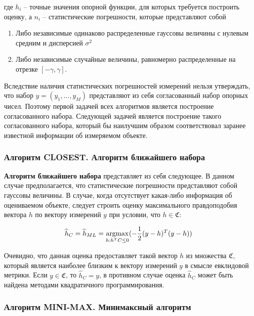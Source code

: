 \documentclass[a4paper, 12pt, titlepage]{article}
\theoremstyle{definition}
\theoremstyle{plain}
\theoremstyle{plain}
\begin{document}
где $h_{i}$ -- точные значения опорной функции, для которых требуется построить
оценку, а $n_{i}$ -- статистические погрешности, которые представляют собой

\begin{enumerate}
 \item Либо независимые одинаково распределенные гауссовы величины с нулевым
 средним и дисперсией $\sigma^{2}$
 \item Либо независимые случайные величины, равномерно распределенные на отрезке
 $[ - \gamma, \gamma]$.
\end{enumerate}

Вследствие наличия статистических погрешностей измерений нельзя утверждать, что
набор $y = (y_{1}, \ldots, y_{M})$ представляют из себя согласованный набор
опорных чисел. Поэтому первой задачей всех алгоритмов является построение
согласованного набора. Следующей задачей является построение такого
согласованного набора, который бы наилучшим образом соответствовал заранее
известной информации об измеряемом объекте.

\subsubsection{Алгоритм CLOSEST. Алгоритм ближайшего набора}
\label{sec:history/PrinceW90/algo-CLOSEST}

\textbf{Алгоритм ближайшего набора} представляет из себя следующее. В данном
случае предполагается, что статистические погрешности представляют собой
гауссовы величины. В случае, когда отсутствует какая-либо информация об
оцениваемом объекте, следует строить оценку максимального правдоподобия вектора
$h$ по вектору измерений $y$ при условии, что $h \in \mathfrak{C}$:

\begin{equation}
\widehat{h}_{C} = \widehat{h}_{ML} =
\operatornamewithlimits{argmax}_{h: h^{T} C \leq 0}
( - \frac{1}{2} (y - h)^{T} (y - h))
\end{equation}

Очевидно, что данная оценка предоставляет такой вектор $h$ из множества
$\mathfrak{C}$, который является наиболее близким к вектору измерений $y$ в
смысле евклидовой метрики. Если $y \in \mathfrak{C}$, то $\widehat{h}_{C} = y$,
в противном случае оценка $\widehat{h}_{C}$ может быть найдена методами
квадратичного программирования.

\subsubsection{Алгоритм MINI-MAX. Минимаксный алгоритм}
\end{document}
